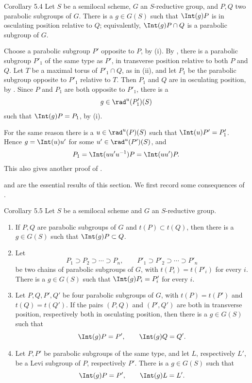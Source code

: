 \begin{sgastatement}{Corollary 5.4}
Let \(S\) be a semilocal scheme, \(G\) an \(S\)-reductive group, and
\(P,Q\) two parabolic subgroups of \(G\).  There is a \(g\in G(S)\)
such that \(\Int(g)P\) is in osculating position relative to \(Q\);
equivalently, \(\Int(g)P\cap Q\) is a parabolic subgroup of \(G\).
\end{sgastatement}

Choose a parabolic subgroup \(P'\) opposite to \(P\), by
\textup{(i)}.  By , there is a parabolic subgroup \(P'_1\) of
the same type as \(P'\), in transverse position relative to both
\(P\) and \(Q\).  Let \(T\) be a maximal torus of \(P'_1\cap Q\),
as in \textup{(ii)}, and let \(P_1\) be the parabolic subgroup
opposite to \(P'_1\) relative to \(T\).  Then \(P_1\) and \(Q\) are
in osculating position, by .  Since \(P\) and \(P_1\) are both
opposite to \(P'_1\), there is a
\[
 g\in\rad^u(P'_1)(S)
\]
such that \(\Int(g)P=P_1\), by \textup{(i)}.
\SGAQED

For the same reason there is a \(u\in\rad^u(P)(S)\) such that
\(\Int(u)P'=P'_1\).  Hence \(g=\Int(u)u'\) for some
\(u'\in\rad^u(P')(S)\), and
\[
 P_1=\Int(uu'u^{-1})P=\Int(uu')P.
\]
This also gives another proof of .

 and  are the essential results of this section.
We first record some consequences of .

\begin{sgastatement}{Corollary 5.5}
Let \(S\) be a semilocal scheme and \(G\) an \(S\)-reductive group.
\begin{enumerate}[label=\textup{(\roman*)}]
\item If \(P,Q\) are parabolic subgroups of \(G\) and
\(t(P)\subset t(Q)\), then there is a \(g\in G(S)\) such that
\(\Int(g)P\subset Q\).
\item Let
\[
 P_1\supset P_2\supset\cdots\supset P_n,\qquad
 P'_1\supset P'_2\supset\cdots\supset P'_n
\]
be two chains of parabolic subgroups of \(G\), with
\(t(P_i)=t(P'_i)\) for every \(i\).  There is a \(g\in G(S)\) such
that \(\Int(g)P_i=P'_i\) for every \(i\).
\item Let \(P,Q,P',Q'\) be four parabolic subgroups of \(G\), with
\(t(P)=t(P')\) and \(t(Q)=t(Q')\).  If the pairs \((P,Q)\) and
\((P',Q')\) are both in transverse position, respectively both in
osculating position, then there is a \(g\in G(S)\) such that
\[
 \Int(g)P=P',\qquad\Int(g)Q=Q'.
\]
\item Let \(P,P'\) be parabolic subgroups of the same type, and let
\(L\), respectively \(L'\), be a Levi subgroup of \(P\), respectively
\(P'\).  There is a \(g\in G(S)\) such that
\[
 \Int(g)P=P',\qquad\Int(g)L=L'.
\]
\end{enumerate}
\end{sgastatement}

